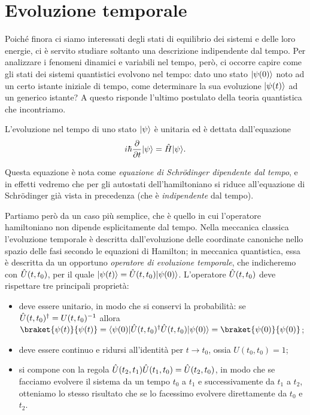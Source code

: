 \chapter{Evoluzione temporale}
Poich\'e finora ci siamo interessati degli stati di equilibrio dei sistemi  e delle loro energie, ci è servito studiare soltanto una descrizione indipendente dal tempo.
Per analizzare i fenomeni dinamici e variabili nel tempo, però, ci occorre capire come gli stati dei sistemi quantistici evolvono nel tempo: dato uno stato $\lvert\psi(0)\rangle$ noto ad un certo istante iniziale di tempo, come determinare la sua evoluzione $\lvert\psi(t)\rangle$ ad un generico istante?
A questo risponde l'ultimo postulato della teoria quantistica che incontriamo.
\begin{postulato}
    L'evoluzione nel tempo di uno stato $\lvert\psi\rangle$ è unitaria ed è dettata dall'equazione
    \begin{equation}
        i\hbar\frac{\partial {}}{\partial {t}}\lvert\psi\rangle=\hat{H}\lvert\psi\rangle.
        \label{eq:schroedinger-dipendente-dal-tempo}
    \end{equation}
\end{postulato}
Questa equazione è nota come \emph{equazione di Schr\"odinger dipendente dal tempo}, e in effetti vedremo che per gli autostati dell'hamiltoniano si riduce all'equazione di Schr\"odinger già vista in precedenza (che è \emph{indipendente} dal tempo).

Partiamo però da un caso più semplice, che è quello in cui l'operatore hamiltoniano non dipende esplicitamente dal tempo.
Nella meccanica classica l'evoluzione temporale è descritta dall'evoluzione delle coordinate canoniche nello spazio delle fasi secondo le equazioni di Hamilton; in meccanica quantistica, essa è descritta da un opportuno \emph{operatore di evoluzione temporale}, che indicheremo con $\hat{U}(t,t_0)$, per il quale $\lvert\psi(t)\rangle=\hat{U}(t,t_0)\lvert\psi(0)\rangle$.
L'operatore $\hat{U}(t,t_0)$ deve rispettare tre principali proprietà:
\begin{itemize}
	\item deve essere unitario, in modo che si conservi la probabilità: se $\hat{U}(t,t_0)^\dagger=U(t,t_0)^{-1}$ allora $\braket{\psi(t)}{\psi(t)}=\bra{\psi(0)}\adj{\op U(t,t_0)}\op U(t,t_0)\ket{\psi(0)}=\braket{\psi(0)}{\psi(0)}$;
	\item deve essere continuo e ridursi all'identità per $t\to t_0$, ossia $U(t_0,t_0)=1$;
	\item si compone con la regola $\hat{U}(t_2,t_1)\hat{U}(t_1,t_0)=\hat{U}(t_2,t_0)$, in modo che se facciamo evolvere il sistema da un tempo $t_0$ a $t_1$ e successivamente da $t_1$ a $t_2$, otteniamo lo stesso risultato che se lo facessimo evolvere direttamente da $t_0$ e $t_2$.
\end{itemize}

